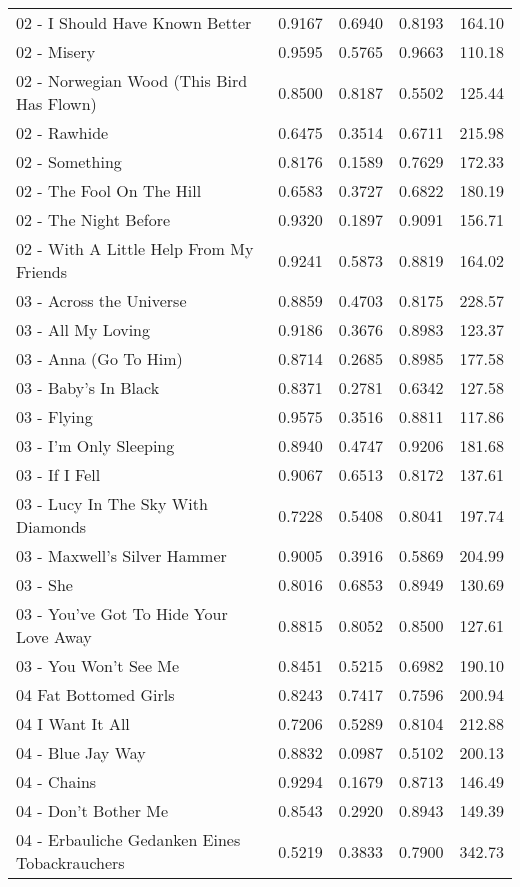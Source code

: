 \begin{longtable}[c]{|p{8cm}|c|l|l|l|}
02 - I Should Have Known Better & 0.9167 & 0.6940 & 0.8193 & 164.10 \\
02 - Misery & 0.9595 & 0.5765 & 0.9663 & 110.18 \\
02 - Norwegian Wood (This Bird Has Flown) & 0.8500 & 0.8187 & 0.5502 & 125.44 \\
02 - Rawhide & 0.6475 & 0.3514 & 0.6711 & 215.98 \\
02 - Something & 0.8176 & 0.1589 & 0.7629 & 172.33 \\
02 - The Fool On The Hill & 0.6583 & 0.3727 & 0.6822 & 180.19 \\
02 - The Night Before & 0.9320 & 0.1897 & 0.9091 & 156.71 \\
02 - With A Little Help From My Friends & 0.9241 & 0.5873 & 0.8819 & 164.02 \\
03 - Across the Universe & 0.8859 & 0.4703 & 0.8175 & 228.57 \\
03 - All My Loving & 0.9186 & 0.3676 & 0.8983 & 123.37 \\
03 - Anna (Go To Him) & 0.8714 & 0.2685 & 0.8985 & 177.58 \\
03 - Baby's In Black & 0.8371 & 0.2781 & 0.6342 & 127.58 \\
03 - Flying & 0.9575 & 0.3516 & 0.8811 & 117.86 \\
03 - I'm Only Sleeping & 0.8940 & 0.4747 & 0.9206 & 181.68 \\
03 - If I Fell & 0.9067 & 0.6513 & 0.8172 & 137.61 \\
03 - Lucy In The Sky With Diamonds & 0.7228 & 0.5408 & 0.8041 & 197.74 \\
03 - Maxwell's Silver Hammer & 0.9005 & 0.3916 & 0.5869 & 204.99 \\
03 - She & 0.8016 & 0.6853 & 0.8949 & 130.69 \\
03 - You've Got To Hide Your Love Away & 0.8815 & 0.8052 & 0.8500 & 127.61 \\
03 - You Won't See Me & 0.8451 & 0.5215 & 0.6982 & 190.10 \\
04 Fat Bottomed Girls & 0.8243 & 0.7417 & 0.7596 & 200.94 \\
04 I Want It All & 0.7206 & 0.5289 & 0.8104 & 212.88 \\
04 - Blue Jay Way & 0.8832 & 0.0987 & 0.5102 & 200.13 \\
04 - Chains & 0.9294 & 0.1679 & 0.8713 & 146.49 \\
04 - Don't Bother Me & 0.8543 & 0.2920 & 0.8943 & 149.39 \\
04 - Erbauliche Gedanken Eines Tobackrauchers & 0.5219 & 0.3833 & 0.7900 & 342.73 \\

\end{longtable}
